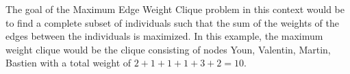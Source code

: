 The goal of the Maximum Edge Weight Clique problem in this context would be to
find a complete subset of individuals such that the sum of the weights of the
edges between the individuals is maximized. In this example, the maximum weight
clique would be the clique consisting of nodes Youn, Valentin, Martin, Bastien
with a total weight of $2+1+1+1+3+2=10$.